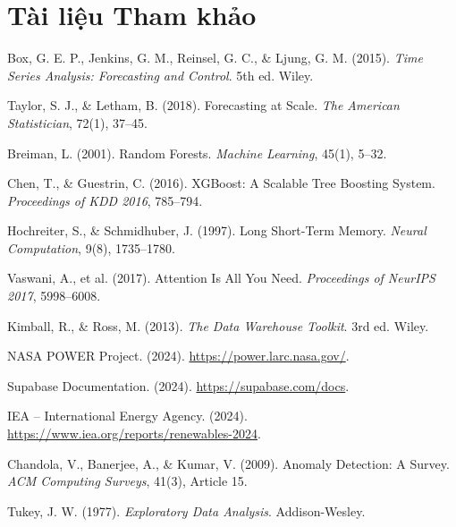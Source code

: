 \documentclass[12pt, a4paper]{report}
\begin{document}
\chapter*{Tài liệu Tham khảo}
\label{chap:thamkhao}

\begin{enumerate}[label={[\arabic*]}, noitemsep]
    \item Box, G. E. P., Jenkins, G. M., Reinsel, G. C., \& Ljung, G. M. (2015). \textit{Time Series Analysis: Forecasting and Control}. 5th ed. Wiley.
    \item Taylor, S. J., \& Letham, B. (2018). Forecasting at Scale. \textit{The American Statistician}, 72(1), 37--45.
    \item Breiman, L. (2001). Random Forests. \textit{Machine Learning}, 45(1), 5--32.
    \item Chen, T., \& Guestrin, C. (2016). XGBoost: A Scalable Tree Boosting System. \textit{Proceedings of KDD 2016}, 785--794.
    \item Hochreiter, S., \& Schmidhuber, J. (1997). Long Short-Term Memory. \textit{Neural Computation}, 9(8), 1735--1780.
    \item Vaswani, A., et al. (2017). Attention Is All You Need. \textit{Proceedings of NeurIPS 2017}, 5998--6008.
    \item Kimball, R., \& Ross, M. (2013). \textit{The Data Warehouse Toolkit}. 3rd ed. Wiley.
    \item NASA POWER Project. (2024). \url{https://power.larc.nasa.gov/}.
    \item Supabase Documentation. (2024). \url{https://supabase.com/docs}.
    \item IEA -- International Energy Agency. (2024). \url{https://www.iea.org/reports/renewables-2024}.
    \item Chandola, V., Banerjee, A., \& Kumar, V. (2009). Anomaly Detection: A Survey. \textit{ACM Computing Surveys}, 41(3), Article 15.
    \item Tukey, J. W. (1977). \textit{Exploratory Data Analysis}. Addison-Wesley.
\end{enumerate}
\end{document}
